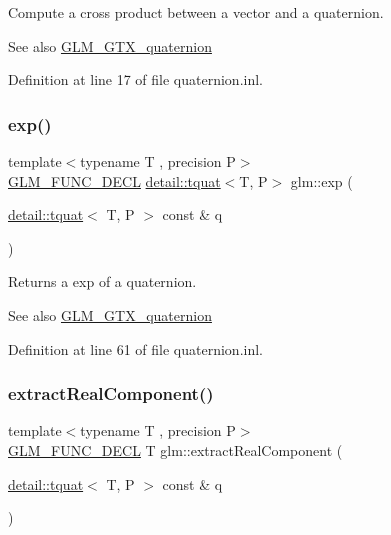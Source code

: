 Compute a cross product between a vector and a quaternion.

\begin{DoxySeeAlso}{See also}
\hyperlink{group__gtx__quaternion}{G\+L\+M\+\_\+\+G\+T\+X\+\_\+quaternion} 
\end{DoxySeeAlso}


Definition at line 17 of file quaternion.\+inl.

\mbox{\label{group__gtx__quaternion_gaadebfad5c8b4b3dde114915f0494b739}} 
\subsubsection{\texorpdfstring{exp()}{exp()}}
{\footnotesize\ttfamily template$<$typename T , precision P$>$ \\
\hyperlink{setup_8hpp_ab2d052de21a70539923e9bcbf6e83a51}{G\+L\+M\+\_\+\+F\+U\+N\+C\+\_\+\+D\+E\+CL} \hyperlink{structglm_1_1detail_1_1tquat}{detail\+::tquat}$<$T, P$>$ glm\+::exp (\begin{DoxyParamCaption}\item[{\hyperlink{structglm_1_1detail_1_1tquat}{detail\+::tquat}$<$ T, P $>$ const \&}]{q }\end{DoxyParamCaption})}

Returns a exp of a quaternion.

\begin{DoxySeeAlso}{See also}
\hyperlink{group__gtx__quaternion}{G\+L\+M\+\_\+\+G\+T\+X\+\_\+quaternion} 
\end{DoxySeeAlso}


Definition at line 61 of file quaternion.\+inl.

\mbox{\label{group__gtx__quaternion_gaad86e595f0021253cb9d34ca32f27f3c}} 
\subsubsection{\texorpdfstring{extract\+Real\+Component()}{extractRealComponent()}}
{\footnotesize\ttfamily template$<$typename T , precision P$>$ \\
\hyperlink{setup_8hpp_ab2d052de21a70539923e9bcbf6e83a51}{G\+L\+M\+\_\+\+F\+U\+N\+C\+\_\+\+D\+E\+CL} T glm\+::extract\+Real\+Component (\begin{DoxyParamCaption}\item[{\hyperlink{structglm_1_1detail_1_1tquat}{detail\+::tquat}$<$ T, P $>$ const \&}]{q }\end{DoxyParamCaption})}

